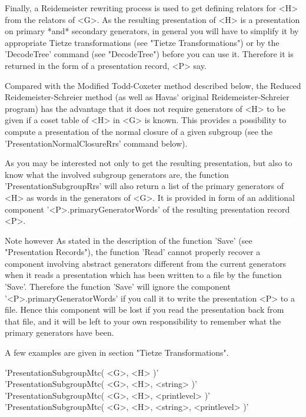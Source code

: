 Finally, a  Reidemeister  rewriting  process  is  used  to  get  defining
relators for <H> from the relators of <G>.  As the resulting presentation
of  <H>  is  a  presentation on  primary *and*  secondary generators,  in
general   you  will   have   to   simplify   it   by  appropriate  Tietze
transformations  (see  "Tietze  Transformations") or  by the 'DecodeTree'
command  (see  "DecodeTree") before  you can use  it.   Therefore  it  is
returned in the form of a presentation record, <P> say.

Compared  with  the  Modified  Todd-Coxeter method described  below,  the
Reduced Rei\-de\-mei\-ster-Schreier method (as well as Havas{\'} original
Reidemeister-Schreier program) has the advantage that it does not require
generators of <H>  to be given if  a coset table of <H> in  <G> is known.
This  provides  a  possibility to compute  a  presentation  of the normal
closure  of a  given  subgroup  (see  the  'PresentationNormalClosureRrs'
command below).

As you may be interested not only  to get the resulting presentation, but
also to know  what  the involved subgroup  generators  are,  the function
'PresentationSubgroupRrs'   will   also return  a   list   of the primary
generators of <H> as words in  the generators of <G>.   It is provided in
form   of an   additional  component  '<P>.primaryGeneratorWords'  of the
resulting presentation record <P>.

Note however{\:} As stated in the description of the function 'Save' (see
"Presentation Records"), the  function  'Read' cannot properly  recover a
component  involving  abstract  generators   different  from the  current
generators when it reads a presentation which has  been written to a file
by  the function  'Save'. Therefore the   function 'Save' will ignore the
component  '<P>.primaryGeneratorWords'  if  you  call it    to  write the
presentation <P> to a file. Hence this component will be lost if you read
the presentation  back from that file,  and it will be  left to  your own
responsibility to remember what the primary generators have been.

A few examples are given in section "Tietze Transformations".

\vspace{5mm}
'PresentationSubgroupMtc( <G>, <H> )'%
 \\
'PresentationSubgroupMtc( <G>, <H>, <string> )' \\
'PresentationSubgroupMtc( <G>, <H>, <printlevel> )' \\
'PresentationSubgroupMtc( <G>, <H>, <string>, <printlevel> )'

